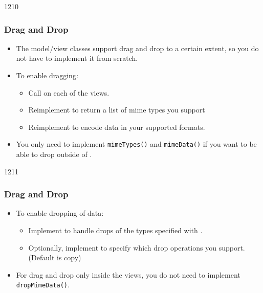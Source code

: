 \begin{slide}{1210}\frametitle{Drag and Drop}\label{model_view_dragndrop}
\begin{itemize}
\item The model/view classes support drag and drop to a certain extent, so
  you do not have to implement it from scratch.
\item To enable dragging:
  \begin{itemize}
  \item Call  on each of
    the views.
  \item Reimplement  to return a
    list of mime types you support
  \item Reimplement  to encode data
    in your supported formats.
  \end{itemize}
\item You only need to implement \texttt{mimeTypes()} and
  \texttt{mimeData()} if you want to be able to drop outside of
  .
\end{itemize}
\end{slide}

\begin{slide}{1211}\frametitle{Drag and Drop}
\begin{itemize}
\item To enable dropping of data:
  \begin{itemize}
  \item Implement  to handle
    drops of the types specified with
    .
  \item Optionally, implement  to specify
    which drop operations you support. (Default is copy)
  \end{itemize}
\item For drag and drop only inside the views, you do not need to implement
  \texttt{dropMimeData()}.
\end{itemize}
\end{slide}
